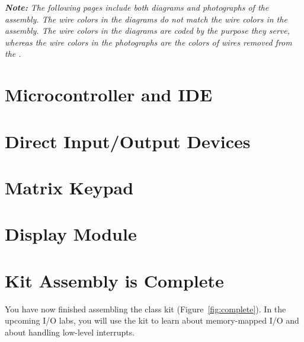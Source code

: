     \textit{
        \textbf{Note:} The following pages include both diagrams and photographs of the assembly.
        The wire colors in the diagrams do not match the wire colors in the assembly.
        The wire colors in the diagrams are coded by the purpose they serve, whereas the wire colors in the photographs are the colors of wires removed from the \rainbow.
    }

\section{Microcontroller and IDE} 

\section{Direct Input/Output Devices} 

\section{Matrix Keypad} 

\section{Display Module} 

\section*{Kit Assembly is Complete}

    You have now finished assembling the class kit (Figure~\ref{fig:complete}).
    In the upcoming I/O labs, you will use the kit to learn about memory-mapped I/O and about handling low-level interrupts.


